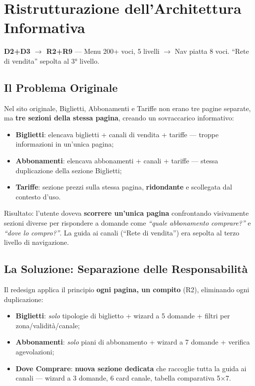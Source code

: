 \vspace{0.3cm}

\section{Ristrutturazione dell'Architettura Informativa}
\label{sec:comparison-ia-3v3}

\textbf{D2+D3 $\rightarrow$ R2+R9} --- Menu 200+ voci, 5 livelli $\rightarrow$ Nav piatta 8 voci. ``Rete di vendita'' sepolta al 3° livello.

\subsection*{Il Problema Originale}

Nel sito originale, Biglietti, Abbonamenti e Tariffe non erano tre pagine separate, ma \textbf{tre sezioni della stessa pagina}, creando un sovraccarico informativo:

\begin{itemize}[nosep]
    \item \textbf{Biglietti}: elencava biglietti + canali di vendita + tariffe --- troppe informazioni in un'unica pagina;
    \item \textbf{Abbonamenti}: elencava abbonamenti + canali + tariffe --- stessa duplicazione della sezione Biglietti;
    \item \textbf{Tariffe}: sezione prezzi sulla stessa pagina, \textbf{ridondante} e scollegata dal contesto d'uso.
\end{itemize}

Risultato: l'utente doveva \textbf{scorrere un'unica pagina} confrontando visivamente sezioni diverse per rispondere a domande come \textit{``quale abbonamento comprare?''} e \textit{``dove lo compro?''}. La guida ai canali (``Rete di vendita'') era sepolta al terzo livello di navigazione.

\subsection*{La Soluzione: Separazione delle Responsabilità}

Il redesign applica il principio \textbf{ogni pagina, un compito} (R2), eliminando ogni duplicazione:

\begin{itemize}[nosep]
    \item \textbf{Biglietti}: \textit{solo} tipologie di biglietto + wizard a 5 domande + filtri per zona/validità/canale;
    \item \textbf{Abbonamenti}: \textit{solo} piani di abbonamento + wizard a 7 domande + verifica agevolazioni;
    \item \textbf{Dove Comprare}: \textbf{nuova sezione dedicata} che raccoglie tutta la guida ai canali --- wizard a 3 domande, 6 card canale, tabella comparativa 5$\times$7.
\end{itemize}


